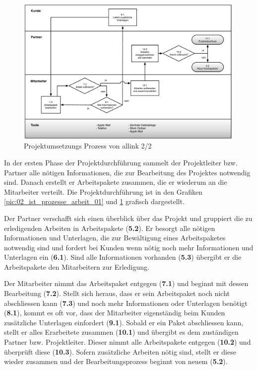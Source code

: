 \begin{figure}[p]
\begin{center}
\includegraphics[width=0.99\textwidth,angle=0]{./bilder/analyse/02_ist_prozesse_arbeit_02.pdf}
\caption[Projektumsetzungs Prozess von allink 2/2]{Projektumsetzungs 
    Prozess von allink 2/2\footnotemark}
\label{pic:02_ist_prozesse_arbeit_02}
\end{center}
\end{figure}

In der ersten Phase der Projektdurchführung sammelt der Projektleiter bzw.
Partner alle nötigen Informationen, die zur Bearbeitung des Projektes notwendig sind.
Danach erstellt er Arbeitspakete zusammen, die er wiederum an die Mitarbeiter verteilt.
Die Projektdurchführung ist in den Grafiken \ref{pic:02_ist_prozesse_arbeit_01} und 
\ref{pic:02_ist_prozesse_arbeit_02} grafisch dargestellt.

Der Partner verschafft sich einen überblick über das Projekt und gruppiert
die zu erledigenden Arbeiten in Arbeitspakete (\textbf{5.2}). Er besorgt alle nötigen Informationen
und Unterlagen, die zur Bewältigung eines Arbeitspaketes notwendig sind und fordert
bei Kunden wenn nötig noch mehr Informationen und Unterlagen ein (\textbf{6.1}).
Sind alle Informationen vorhanden (\textbf{5.3}) übergibt er die Arbeitspakete
den Mitarbeitern zur Erledigung.

Der Mitarbeiter nimmt das Arbeitspaket entgegen (\textbf{7.1}) und beginnt
mit dessen Bearbeitung (\textbf{7.2}). Stellt sich heraus, dass er sein Arbeitspaket
noch nicht abschliessen kann (\textbf{7.3}) und noch mehr Informationen oder
Unterlagen benötigt (\textbf{8.1}), kommt es oft vor, dass der Mitarbeiter
eigenständig beim Kunden zusätzliche Unterlagen einfordert (\textbf{9.1}).
Sobald er ein Paket abschliessen kann, stellt er alles Erarbeitete zusammen (\textbf{10.1})
und übergibt es dem zuständigen Partner bzw. Projektleiter.
Dieser nimmt alle Arbeitspakete entgegen (\textbf{10.2})
und überprüft diese (\textbf{10.3}). Sofern zusätzliche Arbeiten nötig sind,
stellt er diese wieder zusammen und der Bearbeitungsprozess beginnt von neuem (\textbf{5.2}).

